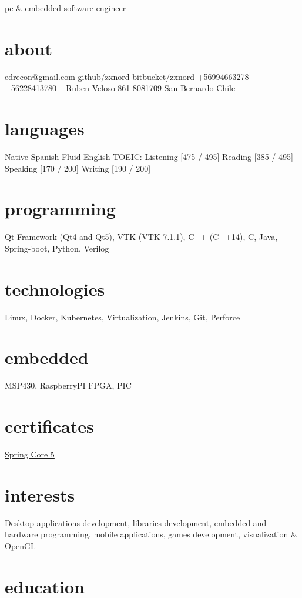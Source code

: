 \documentclass[]{friggeri-cv}
\begin{document}
       {pc \& embedded software engineer}


\begin{aside}
  \section{about}
    \href{mailto:edrecon@gmail.com}{edrecon@gmail.com}
    \href{https://github.com/zxnord}{github/zxnord}
    \href{https://bitbucket.org/zxnord}{bitbucket/zxnord}
    +56994663278
    +56228413780
    ~
    Ruben Veloso 861
    8081709
    San Bernardo
    Chile
  \section{languages}
    Native Spanish
    Fluid English
    TOEIC:
    Listening [475 / 495]
    Reading [385 / 495]
    Speaking [170 / 200]
    Writing [190 / 200]
  \section{programming}
    Qt Framework
    (Qt4 and Qt5), VTK
    (VTK 7.1.1), C++
    (C++14), C, Java,
    Spring-boot, Python,
    Verilog
  \section{technologies}
    Linux, Docker,
    Kubernetes, Virtualization,
    Jenkins, Git, Perforce
  \section{embedded}
    MSP430, RaspberryPI
    FPGA, PIC
  \section{certificates}
    \href{http://bcert.me/scsokmjer}{Spring Core 5}
\end{aside}

\section{interests}

Desktop applications development, libraries development, embedded and hardware programming,
mobile applications, games development, visualization \& OpenGL

\section{education}
\end{document}
